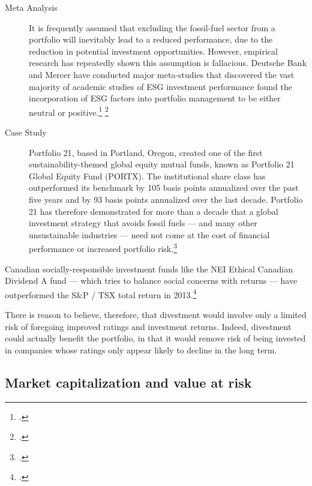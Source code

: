\begin{description}
\begin{quote}
\end{quote}
  \item[Meta Analysis] It is frequently assumed that excluding the fossil-fuel sector from a portfolio will inevitably lead to a reduced performance, due to the reduction in potential investment opportunities.
  However, empirical research has repeatedly shown this assumption is fallacious.
  Deutsche Bank and Mercer have conducted major meta-studies that discovered the vast majority of academic studies of ESG investment performance found the incorporation of ESG factors into portfolio management to be either neutral or positive.\footcite{DeutscheBankSI} \footcite{MercerRI}
  \item[Case Study] Portfolio 21, based in Portland, Oregon, created one of the first sustainability-themed global equity mutual funds, known as Portfolio 21 Global Equity Fund (PORTX). The institutional share class has outperformed its benchmark by 105 basis points annualized over the past five years and by 93 basis points annualized over the last decade. Portfolio 21 has therefore demonstrated for more than a decade that a global investment strategy that avoids fossil fuels --- and many other unsustainable industries --- need not come at the cost of financial performance or increased portfolio risk.\footcite{FossilFreeInvesting}
\end{description}
Canadian socially-responsible investment funds like the NEI Ethical Canadian Dividend A fund --- which tries to balance social concerns with returns --- have outperformed the S\&P / TSX total return in 2013.\footcite[][]{HoldTheirOwn}



There is reason to believe, therefore, that divestment would involve only a limited risk of foregoing improved ratings and investment returns.
Indeed, divestment could actually benefit the portfolio, in that it would remove risk of being invested in companies whose ratings only appear likely to decline in the long term.



	\subsection {Market capitalization and value at risk}



